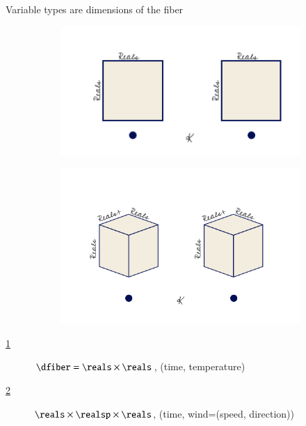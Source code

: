 \documentclass[xcolor={dvipsnames}, handout]{beamer}
\begin{document}
\begin{frame}{Variable types are dimensions of the fiber}
    \begin{figure}[H]
        \begin{subfigure}{.49\textwidth}
            \includegraphics[width=\textwidth]{figures/math/temp_1k.png}
            \caption{}
            \label{fig:fiber_example_plane}
        \end{subfigure}
        \begin{subfigure}{.49\textwidth}
            \includegraphics[width=\textwidth]{figures/math/temp_3f.png}
            \caption{}
            \label{fig:fiber_example_cube}
        \end{subfigure}
        \caption{}
        \label{fig:data_fiber_example}
    \end{figure}
    \begin{description}
        \item[\ref{fig:fiber_example_plane}]  $\dfiber=\reals\times\reals$, (time, temperature)
        \item[\ref{fig:fiber_example_cube}]  $\reals\times\realsp\times\reals$, (time, wind=(speed, direction))
    \end{description}
\end{frame}
\end{document}
